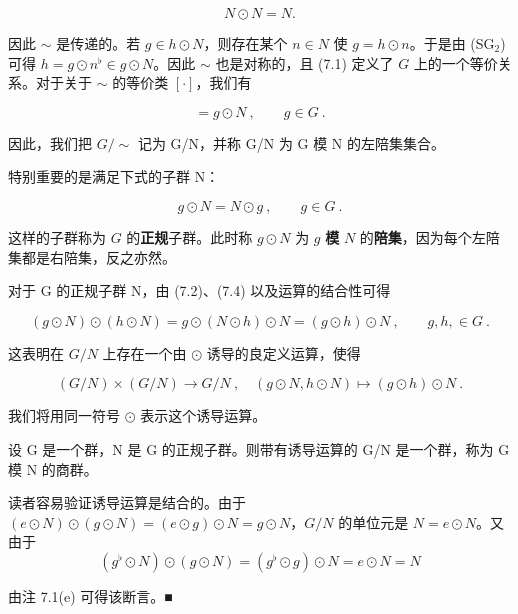 \begin{equation}
N\odot N=N.
\end{equation}

因此 $\sim$ 是传递的。若 $g \in h \odot N$，则存在某个 $n \in N$ 使 $g = h \odot n$。于是由 (SG$_{2}$) 可得 $h = g \odot n^{\flat} \in g \odot N$。因此 $\sim$ 也是对称的，且 (7.1) 定义了 $G$ 上的一个等价关系。对于关于 $\sim$ 的等价类 $[ \cdot ]$，我们有

\begin{equation}
[g]=g\odot N~,\qquad g\in G~.
\end{equation}

因此，我们把 $ G/\sim $ 记为 G/N，并称 G/N 为 G 模 N 的左陪集集合。

特别重要的是满足下式的子群 N：

\begin{equation}
g\odot N=N\odot g~,\qquad g\in G~.
\end{equation}

这样的子群称为 $G$ 的\textbf{正规}子群。此时称 $g\odot N$ 为 $g$ \textbf{模} $N$ 的\textbf{陪集}，因为每个左陪集都是右陪集，反之亦然。

对于 G 的正规子群 N，由 (7.2)、(7.4) 以及运算的结合性可得

\[
(g\odot N)\odot(h\odot N)=g\odot(N\odot h)\odot N=(g\odot h)\odot N~,\qquad g,h,\in G~.
\]

这表明在 $G/N$ 上存在一个由 $\odot$ 诱导的良定义运算，使得

\begin{equation}
(G/N)\times(G/N)\to G/N~,\quad(g\odot N,h\odot N)\mapsto(g\odot h)\odot N~.
\end{equation}

我们将用同一符号 $ \odot $ 表示这个诱导运算。

\begin{proposition}

设 G 是一个群，N 是 G 的正规子群。则带有诱导运算的 G/N 是一个群，称为 G 模 N 的商群。

\proofhead
读者容易验证诱导运算是结合的。由于 $(e\odot N)\odot(g\odot N)=(e\odot g)\odot N=g\odot N$，$G/N$ 的单位元是 $N=e\odot N$。又由于
\[
(g^{\flat}\odot N)\odot(g\odot N)=(g^{\flat}\odot g)\odot N=e\odot N=N
\]

由注 7.1(e) 可得该断言。■

\end{proposition}

